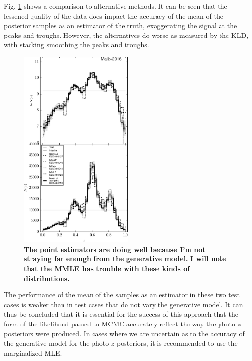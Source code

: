 \documentclass[preprint]{aastex}
\begin{document}
Fig. \ref{fig:multi-comp} shows a comparison to alternative methods.  It can be 
seen that the lessened quality of the data does impact the accuracy of the mean 
of the posterior samples as an estimator of the truth, exaggerating the signal 
at the peaks and troughs.  However, the alternatives do worse as measured by 
the KLD, with stacking smoothing the peaks and troughs.


\begin{figure}
\includegraphics[width=0.5\textwidth]{figs/mult/comps.pdf}
\caption{\textbf{The point estimators are doing well because I'm not straying 
far enough from the generative model.  I will note that the MMLE has trouble 
with these kinds of distributions.}}
\label{fig:multi-comp}
\end{figure}

The performance of the mean of the samples as an estimator in these two test 
cases is weaker than in test cases that do not vary the generative model.  It 
can thus be concluded that it is essential for the success of this approach 
that the form of the likelihood passed to MCMC accurately reflect the way the 
photo-$z$ posteriors were produced.  In cases where we are uncertain as to the 
accuracy of the generative model for the photo-$z$ posteriors, it is 
recommended to use the marginalized MLE.
\end{document}
